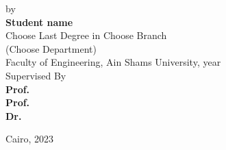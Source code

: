 \begin{center}
\vfill
\small
by\\
\large
\textbf{Student name}\\
\small
Choose Last Degree in Choose Branch  \\
(Choose Department)\\
Faculty of Engineering, Ain Shams University, year\\







\vfill
\small
Supervised By\\
\normalsize
\textbf{Prof.~\\
	  Prof.~\\
	  Dr.~}

\vfill
\small
Cairo, 2023\\

\end{center}
